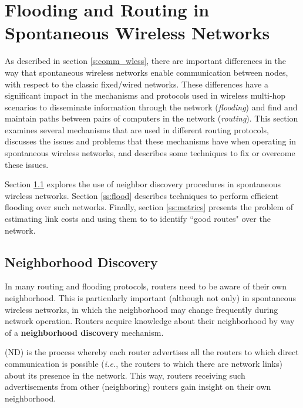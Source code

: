 \section{Flooding and Routing in Spontaneous Wireless Networks}
\label{s:flood_rtg}


As described in section \ref{s:comm_wless}, there are important differences in the way that spontaneous wireless networks enable communication between nodes, with respect to the classic fixed/wired networks. These differences have a significant impact in the mechanisms and protocols used in wireless multi-hop scenarios to disseminate information through the network ({\em flooding}) and find and maintain paths between pairs of computers in the network ({\em routing}). This section examines several mechanisms that are used in different routing protocols, discusses the issues and problems that these mechanisms have when operating in spontaneous wireless networks, and describes some techniques to fix or overcome these issues. 

Section \ref{ss:nd} explores the use of neighbor discovery procedures in spontaneous wireless networks. Section \ref{ss:flood} describes techniques to perform efficient flooding over such networks. Finally, section \ref{ss:metrics} presents the problem of estimating link costs and using them to to identify ``good routes" over the network.  

\subsection{Neighborhood Discovery}
\label{ss:nd}

In many routing and flooding protocols, routers need to be aware of their own neighborhood. This is particularly important (although not only) in spontaneous wireless networks, in which the neighborhood may change frequently during network operation. Routers acquire knowledge about their neighborhood by way of a {\bf neighborhood discovery} mechanism.

\begin{definition}
(ND) is the process whereby each router advertises all the routers to which direct communication is possible ({\em i.e.}, the routers to which there are network links) about its presence in the network. This way, routers receiving such advertisements from other (neighboring) routers gain insight on their own neighborhood.
\end{definition}

